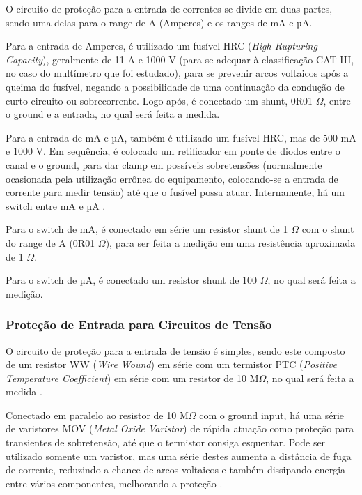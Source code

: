O circuito de proteção para a entrada de correntes se divide em duas partes, sendo uma delas para o range de A (Amperes) e os ranges de mA e µA.

Para a entrada de Amperes, é utilizado um fusível \gls{HRC} (\textit{High Rupturing Capacity}), geralmente de 11 A e 1000 V (para se adequar à classificação CAT III, no caso do multímetro que foi estudado), para se prevenir arcos voltaicos após a queima do fusível, negando a possibilidade de uma continuação da condução de curto-circuito ou sobrecorrente. Logo após, é conectado um shunt, 0R01 $\Omega$, entre o ground e a entrada, no qual será feita a medida.

Para a entrada de mA e µA, também é utilizado um fusível \gls{HRC}, mas de 500 mA e 1000 V. Em sequência, é colocado um retificador em ponte de diodos entre o canal e o ground, para dar clamp em possíveis sobretensões (normalmente ocasionada pela utilização errônea do equipamento, colocando-se a entrada de corrente para medir tensão) até que o fusível possa atuar. Internamente, há um switch entre mA e µA \cite{fluke27manual}.

Para o switch de mA, é conectado em série um resistor shunt de 1 $\Omega$ com o shunt do range de A (0R01 $\Omega$), para ser feita a medição em uma resistência aproximada de 1 $\Omega$.

Para o switch de µA, é conectado um resistor shunt de 100 $\Omega$, no qual será feita a medição. \cite{IPblog}%

\subsubsection{Proteção de Entrada para Circuitos de Tensão}\label{subsec:protecaoTensao}

O circuito de proteção para a entrada de tensão é simples, sendo este composto de um resistor \gls{WW} (\textit{Wire Wound}) em série com um termistor \gls{PTC} (\textit{Positive Temperature Coefficient}) em série com um resistor de 10 M$\Omega$, no qual será feita a medida \cite{fluke27manual}.

Conectado em paralelo ao resistor de 10 M$\Omega$ com o ground input, há uma série de varistores \gls{MOV} (\textit{Metal Oxide Varistor}) de rápida atuação como proteção para transientes de sobretensão, até que o termistor consiga esquentar. Pode ser utilizado somente um varistor, mas uma série destes aumenta a distância de fuga de corrente, reduzindo a chance de arcos voltaicos e também dissipando energia entre vários componentes, melhorando a proteção \cite{flukeblog}.

